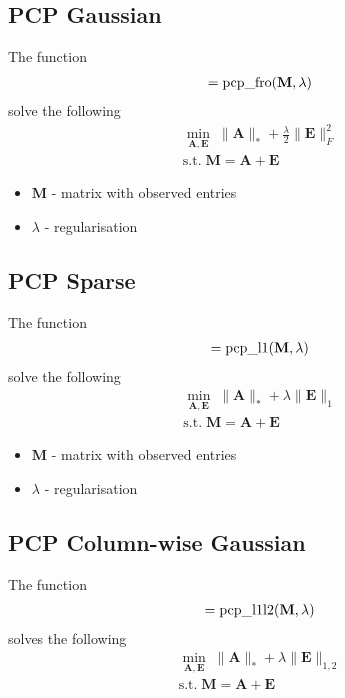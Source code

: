 \documentclass{article}
\begin{document}
\subsection{PCP Gaussian}
\label{pcp_fro}

The function
\begin{align}
[ \mathbf A ] = \text{pcp\_fro}( \mathbf M, \lambda ) \notag
\end{align}
solve the following
\begin{align}
\min_{\mathbf{A, E}} \; \| \mathbf A \|_* + \frac{\lambda}{2} \| \mathbf E \|_F^2\\
\text{s.t.} \; \mathbf { M = A + E } \nonumber 
\end{align}

\begin{itemize}
\item $\mathbf M$ - matrix with observed entries
\item $\lambda$ - regularisation
\end{itemize}

\subsection{PCP Sparse}
\label{pcp_l1}

The function
\begin{align}
[ \mathbf A ] = \text{pcp\_l1}( \mathbf M, \lambda ) \notag
\end{align}
solve the following
\begin{align}
\min_{\mathbf{A, E}} \; \| \mathbf A \|_* + \lambda \| \mathbf E \|_1\\
\text{s.t.} \; \mathbf { M = A + E } \nonumber 
\end{align}

\begin{itemize}
\item $\mathbf M$ - matrix with observed entries
\item $\lambda$ - regularisation
\end{itemize}

\subsection{PCP Column-wise Gaussian}
\label{pcp_l1l2}

The function
\begin{align}
[ \mathbf A ] = \text{pcp\_l1l2}( \mathbf M, \lambda ) \notag
\end{align}
solves the following
\begin{align}
\min_{\mathbf{A, E}} \; \| \mathbf A \|_* + \lambda \| \mathbf E \|_{1,2}\\
\text{s.t.} \; \mathbf { M = A + E } \nonumber 
\end{align}
\end{document}

